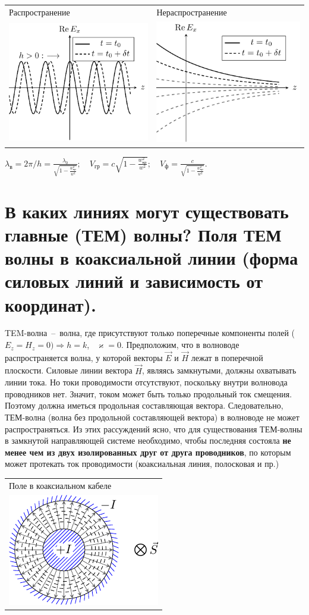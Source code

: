 \begin{multicols*}{2}
		\begin{tabular}{l l}
			{Распространение} & {Нераспространение} \\
			\includegraphics[width=0.25\linewidth]{aed_imgs/lect3_ris1} &
			\includegraphics[width=0.25\linewidth]{aed_imgs/lect3_ris2} \\
		\end{tabular}
		
		$\lambda_\text{в}=2\pi/h=\frac{\lambda_0}{\sqrt{1-\frac{w_\text{кр}^2}{w^2}}};\quad V_\text{гр}=c \sqrt{1-\frac{w_\text{кр}^2}{w^2}};\quad V_\text{ф}=\frac{c}{\sqrt{1-\frac{w_\text{кр}^2}{w^2}}}$.
		
		\section{В каких линиях могут существовать главные (ТЕМ) волны? Поля ТЕМ волны в коаксиальной линии (форма силовых линий и зависимость от координат).}
		
		TEM-волна~--~волна, где присутствуют только поперечные компоненты полей ($E_z = H_z = 0) \Rightarrow h = k$,~ $\varkappa = 0$. Предположим, что в волноводе распространяется волна, у которой векторы $\vec{E}$ и $\vec{H}$ лежат в поперечной плоскости. Силовые линии вектора $\vec{H}$, являясь замкнутыми, должны охватывать линии тока. Но токи проводимости отсутствуют, поскольку внутри волновода проводников нет. Значит, током может быть только продольный ток смещения. Поэтому должна иметься продольная составляющая вектора. Следовательно, ТЕМ-волна (волна без продольной составляющей вектора) в волноводе не может распространяться. Из этих рассуждений ясно, что для существования ТЕМ-волны в замкнутой направляющей системе необходимо, чтобы последняя состояла \textbf{не менее чем из двух изолированных друг от друга проводников}, по которым может протекать ток проводимости (коаксиальная линия, полосковая и пр.)\\
		\begin{tabular}{l}
			{Поле в коаксиальном кабеле} \\
			\includegraphics[width=0.25\linewidth]{aed_imgs/lect4_ris6} \\
		\end{tabular}
		

\end{multicols*}
